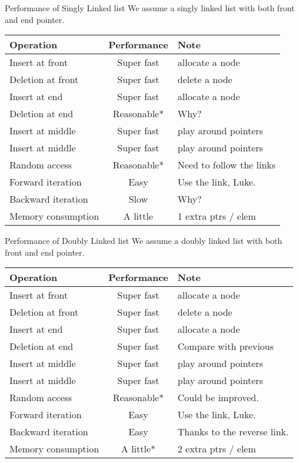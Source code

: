 \begin{frame}{Performance of Singly Linked list}
We assume a singly linked list with both front and end pointer. 

\vspace{-.1in}
\begin{table}
	\begin{tabular}{l | c | l }
		Operation & Performance & Note \\
		\hline \hline
		Insert at front & Super fast  & allocate a node\\ 
		Deletion at front & Super fast & delete a node\\
		Insert at end & Super fast & allocate a node\\
		Deletion at end & \alert{Reasonable*} & Why?\\
		Insert at middle & Super fast & play around pointers\\
		Insert at middle & Super fast & play around pointers\\
		Random access & \alert{Reasonable*} & Need to follow the links\\
		Forward iteration & Easy & Use the link, Luke.\\
		Backward iteration & \alert{Slow} & Why? \\
		Memory consumption & \alert{A little} & 1 extra ptrs / elem\\
	\end{tabular}
\end{table}
\end{frame}

\begin{frame}{Performance of \alert{Doubly} Linked list}
We assume a doubly linked list with both front and end pointer. 

\vspace{-.1in}
\begin{table}
	\begin{tabular}{l | c | l }
		Operation & Performance & Note \\
		\hline \hline
		Insert at front & Super fast  & allocate a node\\ 
		Deletion at front & Super fast & delete a node\\
		Insert at end & Super fast & allocate a node\\
		Deletion at end & \alert{Super fast} & Compare with previous\\
		Insert at middle & Super fast & play around pointers\\
		Insert at middle & Super fast & play around pointers\\
		Random access & \alert{Reasonable*} & Could be improved.\\
		Forward iteration & Easy & Use the link, Luke.\\
		Backward iteration & \alert{Easy} & Thanks to the reverse link.\\
		Memory consumption & A little* &  2 extra ptrs / elem \\
	\end{tabular}
\end{table}
\end{frame}

